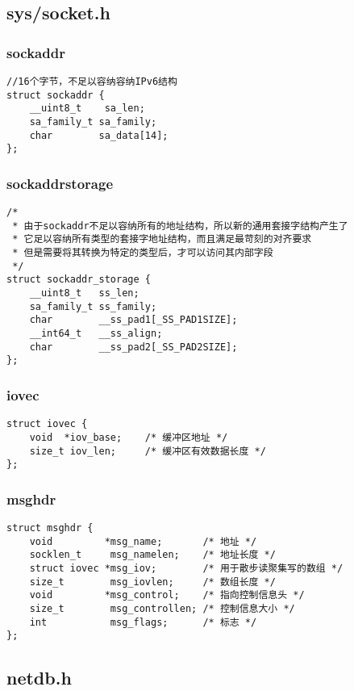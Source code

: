 \subsection{sys/socket.h}
\subsubsection{sockaddr}
\begin{verbatim}
//16个字节，不足以容纳容纳IPv6结构
struct sockaddr {
    __uint8_t    sa_len;
    sa_family_t sa_family;
    char        sa_data[14];
};
\end{verbatim}

\subsubsection{sockaddr\li storage}
\begin{verbatim}
/*
 * 由于sockaddr不足以容纳所有的地址结构，所以新的通用套接字结构产生了
 * 它足以容纳所有类型的套接字地址结构，而且满足最苛刻的对齐要求
 * 但是需要将其转换为特定的类型后，才可以访问其内部字段
 */
struct sockaddr_storage {
    __uint8_t   ss_len;
    sa_family_t ss_family;
    char        __ss_pad1[_SS_PAD1SIZE];
    __int64_t   __ss_align;
    char        __ss_pad2[_SS_PAD2SIZE];
};
\end{verbatim}

\subsubsection{iovec}
\begin{verbatim}
struct iovec {
    void  *iov_base;    /* 缓冲区地址 */
    size_t iov_len;     /* 缓冲区有效数据长度 */
};
\end{verbatim}

\subsubsection{msghdr}
\begin{verbatim}
struct msghdr {
    void         *msg_name;       /* 地址 */
    socklen_t     msg_namelen;    /* 地址长度 */
    struct iovec *msg_iov;        /* 用于散步读聚集写的数组 */
    size_t        msg_iovlen;     /* 数组长度 */
    void         *msg_control;    /* 指向控制信息头 */
    size_t        msg_controllen; /* 控制信息大小 */
    int           msg_flags;      /* 标志 */
};
\end{verbatim}

\subsection{netdb.h}
